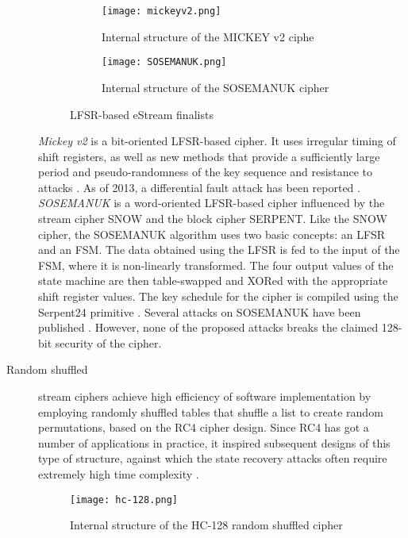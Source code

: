 \begin{description}
	\begin{figure}[h]
		
		\begin{subfigure}{0.5\textwidth}
			\texttt{[image: mickeyv2.png]} 
			\caption{Internal structure of the MICKEY v2 ciphe}
			\label{fig:mickeyv2}
		\end{subfigure}
		\begin{subfigure}{0.5\textwidth}
			\texttt{[image: SOSEMANUK.png]} 
			\caption{Internal structure of the SOSEMANUK cipher}
			\label{fig:sosemanuk}
		\end{subfigure}
		
		\caption{LFSR-based eStream finalists}
		\label{fig:lfsr}
		
	\end{figure}
	
	
	\emph{Mickey v2} is a bit-oriented LFSR-based cipher. It uses irregular timing of shift registers, as well as new methods that provide a sufficiently large period and pseudo-randomness of the key sequence and resistance to attacks \cite{babbage2006stream}. As of 2013, a differential fault attack has been reported \cite{banik2015improved}.\\
	\emph{SOSEMANUK} is a word-oriented LFSR-based cipher influenced by the stream cipher SNOW and the block cipher SERPENT. Like the SNOW cipher, the SOSEMANUK algorithm uses two basic concepts: an LFSR and an FSM. The data obtained using the LFSR is fed to the input of the FSM, where it is non-linearly transformed. The four output values of the state machine are then table-swapped and XORed with the appropriate shift register values. The key schedule for the cipher is compiled using the Serpent24 primitive \cite{berbain2008sosemanuk}. Several attacks on SOSEMANUK have been published \cite{tsunoo2006evaluation} \cite{lee2008cryptanalysis}. However, none of the proposed attacks breaks the claimed 128-bit security of the cipher.
	
	\item [Random shuffled] stream ciphers achieve high efficiency of software implementation by employing randomly shuffled tables that shuffle a list to create random permutations, based on the RC4 cipher design. Since RC4 has got a number of applications in practice, it inspired subsequent designs of this type of structure, against which the state recovery attacks often require extremely high time complexity \cite{jiao2020stream}. 
	
	\begin{figure}[h]
		\centering
		\texttt{[image: hc-128.png]}
		\caption{Internal structure of the HC-128 random shuffled cipher}
	\end{figure}
	

\end{description}
